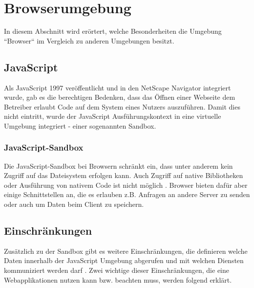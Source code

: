 \section{Browserumgebung}


In diesem Abschnitt wird erörtert, welche Besonderheiten die Umgebung ``Browser`` im Vergleich zu anderen Umgebungen besitzt.

\subsection{JavaScript}

Als JavaScript 1997 veröffentlicht und in den NetScape Navigator integriert wurde, gab es die berechtigen Bedenken, dass das Öffnen einer Webseite dem Betreiber erlaubt Code auf dem System eines Nutzers auszuführen. Damit dies nicht eintritt, wurde der JavaScript Ausführungskontext in eine virtuelle Umgebung  integriert - einer sogenannten Sandbox. \cite{LearningJavaScript}


\subsubsection{JavaScript-Sandbox}

Die JavaScript-Sandbox bei Browsern schränkt ein, dass unter anderem kein Zugriff auf das Dateisystem erfolgen kann. Auch Zugriff auf native Bibliotheken oder Ausführung von nativem Code ist nicht möglich \cite{TheSpyInTheSandbox}. Browser bieten dafür aber einige Schnittstellen an, die es erlauben z.B. Anfragen an andere Server zu senden oder auch um Daten beim Client zu speichern.

\subsection{Einschränkungen}

Zusätzlich zu der Sandbox gibt es weitere Einschränkungen, die definieren welche Daten innerhalb der JavaScript Umgebung abgerufen und mit welchen Diensten kommuniziert werden darf \cite{LearningJavaScript}. Zwei wichtige dieser Einschränkungen, die eine Webapplikationen nutzen kann bzw. beachten muss, werden folgend erklärt.


